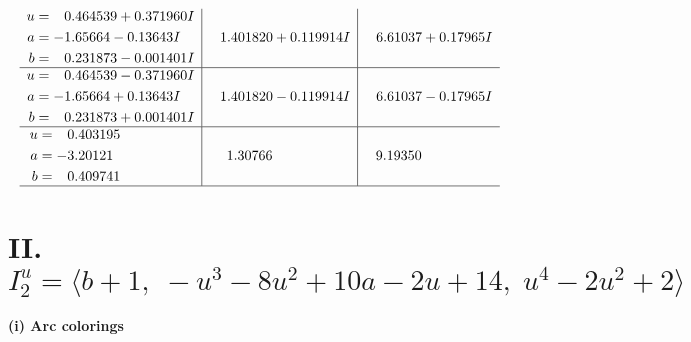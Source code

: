 \documentclass[1p]{elsarticle_modified}
\theoremstyle{definition}
\begin{document}
$$\begin{array}{c|c|c}
\begin{aligned}
u &= \phantom{-}0.464539 + 0.371960 I \\
a &= -1.65664 - 0.13643 I \\
b &= \phantom{-}0.231873 - 0.001401 I\end{aligned}
 & \phantom{-}1.401820 + 0.119914 I & \phantom{-}6.61037 + 0.17965 I \\ \hline\begin{aligned}
u &= \phantom{-}0.464539 - 0.371960 I \\
a &= -1.65664 + 0.13643 I \\
b &= \phantom{-}0.231873 + 0.001401 I\end{aligned}
 & \phantom{-}1.401820 - 0.119914 I & \phantom{-}6.61037 - 0.17965 I \\ \hline\begin{aligned}
u &= \phantom{-}0.403195\phantom{ +0.000000I} \\
a &= -3.20121\phantom{ +0.000000I} \\
b &= \phantom{-}0.409741\phantom{ +0.000000I}\end{aligned}
 & \phantom{-}1.30766\phantom{ +0.000000I} & \phantom{-}9.19350\phantom{ +0.000000I}\\
 \hline 
 \end{array}$$\newpage\newpage\renewcommand{\arraystretch}{1}
\centering \section*{II. $I^u_{2}= \langle b+1,\;- u^3-8 u^2+10 a-2 u+14,\;u^4-2 u^2+2 \rangle$}
\flushleft \textbf{(i) Arc colorings}\\
\end{document}
